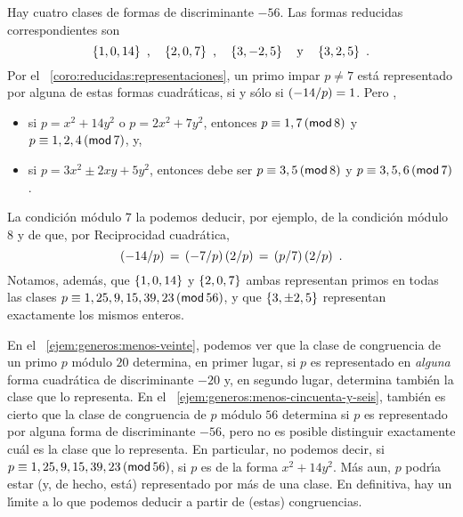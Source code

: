 \begin{ejemGeneros}\label{ejem:generos:menos-cincuenta-y-seis}
	Hay cuatro clases de formas de discriminante $-56$. Las formas
	reducidas correspondientes son
	\begin{displaymath}
		\binaria{1,0,14} \dispcomma\quad
		\binaria{2,0,7} \dispcomma\quad
		\binaria{3,-2,5} \dispand
		\binaria{3,2,5}
		\dispstop
	\end{displaymath}
	Por el \coroname~\ref{coro:reducidas:representaciones},
	un primo impar $p\neq 7$ est\'a representado por alguna de estas
	formas cuadr\'aticas, si y s\'olo si $\tlegendre{-14} p=1$. Pero
	\quedacomoejercicio,
	\begin{itemize}
		\item si $p=x^2+14y^2$ o $p=2x^2+7y^2$, entonces
			$p\equiv 1,7\tmodulo[8]$ y
			$p\equiv 1,2,4\tmodulo[7]$, y,
		\item si $p=3x^2\pm 2xy+5y^2$, entonces debe ser
			$p\equiv 3,5\tmodulo[8]$ y
			$p\equiv 3,5,6\tmodulo[7]$.
	\end{itemize}
	La condici\'on m\'odulo $7$ la podemos deducir, por ejemplo, de la
	condici\'on m\'odulo $8$ y de que, por Reciprocidad cuadr\'atica,
	\begin{displaymath}
		\tlegendre{-14} p\,=\,\tlegendre{-7} p\tlegendre 2 p\,=\,
			\tlegendre p 7\tlegendre 2 p
		\dispstop
	\end{displaymath}
	Notamos, adem\'as, que $\binaria{1,0,14}$ y $\binaria{2,0,7}$ ambas
	representan primos en todas las clases
	$p\equiv 1,25,9,15,39,23\tmodulo[56]$,
	y que $\binaria{3,\pm 2,5}$ representan exactamente los mismos
	enteros.
\end{ejemGeneros}

\begin{obsGeneros}\label{obs:generos:ejemplos}
	En el \ejemname~\ref{ejem:generos:menos-veinte},
	podemos ver que la clase de congruencia de un primo $p$ m\'odulo $20$
	determina, en primer lugar, si $p$ es representado en \emph{alguna}
	forma cuadr\'atica de discriminante $-20$ y, en segundo lugar,
	determina tambi\'en la clase que lo representa.
	En el \ejemname~\ref{ejem:generos:menos-cincuenta-y-seis}, tambi\'en
	es cierto que la clase de congruencia de $p$ m\'odulo $56$
	determina si $p$ es representado por alguna forma de discriminante
	$-56$, pero no es posible distinguir exactamente cu\'al es la clase
	que lo representa. En particular, no podemos decir, si
	$p\equiv 1,25,9,15,39,23\tmodulo[56]$, si $p$ es de la forma
	$x^2+14y^2$. M\'as aun, $p$ podr\'{\i}a estar (y, de hecho, est\'a)
	representado por m\'as de una clase.
	En definitiva, hay un l\'{\i}mite a lo que podemos deducir a partir
	de (estas) congruencias.
\end{obsGeneros}

